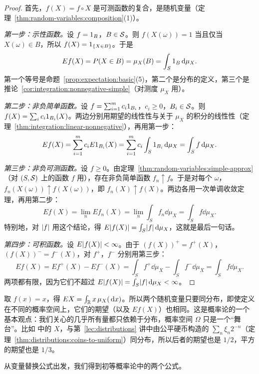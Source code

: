 \begin{proof}
首先，$f(X)=f\circ X$ 是可测函数的复合，是随机变量（定理~\ref{thm:random-variables:composition}(1)）。

\emph{第一步：示性函数。}设 $f=1_B$，$B\in\mathcal{S}$。则 $f(X(\omega))=1$ 当且仅当 $X(\omega)\in B$，所以 $f(X)=1_{\{X\in B\}}$。于是
\[
Ef(X)=P(X\in B)=\mu_X(B)=\int_S1_B\,\mathrm{d}\mu_X .
\]
第一个等号是命题~\ref{prop:expectation:basic}(5)，第二个是分布的定义，第三个是推论~\ref{cor:integration:nonnegative-simple}（对测度 $\mu_X$ 用）。

\emph{第二步：非负简单函数。}设 $f=\sum_{i=1}^mc_i1_{B_i}$，$c_i\geqslant0$，$B_i\in\mathcal{S}$。则 $f(X)=\sum_ic_i1_{B_i}(X)$。两边分别用期望的线性性与关于 $\mu_X$ 的积分的线性性（定理~\ref{thm:integration:linear-nonnegative}），再用第一步：
\[
Ef(X)=\sum_{i=1}^mc_iE1_{B_i}(X)=\sum_{i=1}^mc_i\int_S1_{B_i}\,\mathrm{d}\mu_X=\int_Sf\,\mathrm{d}\mu_X .
\]

\emph{第三步：非负可测函数。}设 $f\geqslant0$。由定理~\ref{thm:random-variables:simple-approx}（对 $(S,\mathcal{S})$ 上的函数 $f$ 用），存在非负简单函数 $f_n\uparrow f$。于是对每个 $\omega$，$f_n(X(\omega))\uparrow f(X(\omega))$，即 $f_n(X)\uparrow f(X)$。两边各用一次单调收敛定理，再用第二步：
\[
Ef(X)=\lim_nEf_n(X)=\lim_n\int_Sf_n\dd\mu_X=\int_Sf\dd\mu_X .
\]
特别地，对 $\lvert f\rvert$ 用这个结论，得 $E\lvert f(X)\rvert=\int_S\lvert f\rvert\,\mathrm{d}\mu_X$，这就是最后一句话。

\emph{第四步：可积函数。}设 $E\lvert f(X)\rvert<\infty$。由于 $(f(X))^+=f^+(X)$，$(f(X))^-=f^-(X)$，对 $f^+$，$f^-$ 分别用第三步：
\[
Ef(X)=Ef^+(X)-Ef^-(X)=\int_Sf^+\dd\mu_X-\int_Sf^-\dd\mu_X=\int_Sf\dd\mu_X .
\]
两项都有限，因为它们不超过 $E\lvert f(X)\rvert=\int_S\lvert f\rvert\,\mathrm{d}\mu_X<\infty$。
\end{proof}

\begin{remark}[期望只依赖于分布]
取 $f(x)=x$，得 $EX=\int_{\mathbb{R}} x\,\mu_X(\,\mathrm{d} x)$。所以两个随机变量只要同分布，即使定义在不同的概率空间上，它们的期望（以及 $Ef(X)$）也相同。这是概率论的一个基本观点：我们关心的几乎所有量都只依赖于分布，概率空间 $\Omega$ 只是一个“舞台”。比如 中的 $X$，与第~\ref{lec:distributions} 讲中由公平硬币构造的 $\sum_n\xi_n2^{-n}$（定理~\ref{thm:distributions:coins-to-uniform}）同分布，所以后者的期望也是 $1/2$，平方的期望也是 $1/3$。
\end{remark}

从变量替换公式出发，我们得到初等概率论中的两个公式。

